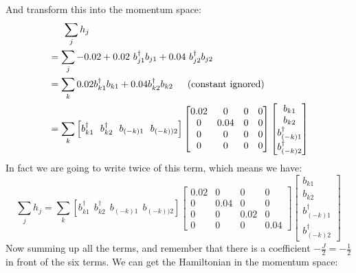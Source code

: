 \documentclass[letter]{article}
\begin{document}
And transform this into the momentum space:$$
\begin{aligned}
    &\indent \sum_j  h_j\\
    &=\sum _j -0.02+0.02\ b_{j1}^{\dagger}b_{j1}+0.04\ b_{j2}^{\dagger}b_{j2}\\
    &=\sum_{k}0.02b_{k1}^{\dagger}b_{k1}+0.04b_{k2}^{\dagger}b_{k2} \indent \text{(constant ignored)}\\
    &=\sum_k \left[
        b_{k1}^{\dagger} \ \ 
        b_{k2}^{\dagger}\  \ 
        b_{(-k)1}\ \ 
        b_{(-k))2}\right]
       \begin{bmatrix}
        0.02 & 0 & 0 & 0 \\
           0 &  0.04 & 0 &0 \\
           0 &  0 & 0 &0\\
            0 & 0 & 0& 0
            \end{bmatrix}\begin{bmatrix}
                b_{k1}  \\
                b_{k2}  \\
                b_{(-k)1}^{\dagger}\\
                b_{(-k)2}^{\dagger}
                \end{bmatrix}
\end{aligned}
$$
In fact we are going to write twice of this term, which means we have:
$$\sum_j  h_j=\sum_k \left[
    b_{k1}^{\dagger} \ \ 
    b_{k2}^{\dagger}\  \ 
    b_{(-k)1}\ \ 
    b_{(-k))2}\right]
   \begin{bmatrix}
    0.02 & 0 & 0 & 0 \\
       0 &  0.04 & 0 &0 \\
       0 &  0 & 0.02 &0\\
        0 & 0 & 0& 0.04
        \end{bmatrix}\begin{bmatrix}
            b_{k1}  \\
            b_{k2}  \\
            b_{(-k)1}^{\dagger}\\
            b_{(-k)2}^{\dagger}
            \end{bmatrix}
$$
Now summing up all the terms, and remember that there is a coefficient $-\frac{J}{2}=-\frac{1}{2}$ in front of the six terms. We can get the Hamiltonian in the momentum space:
\end{document}
